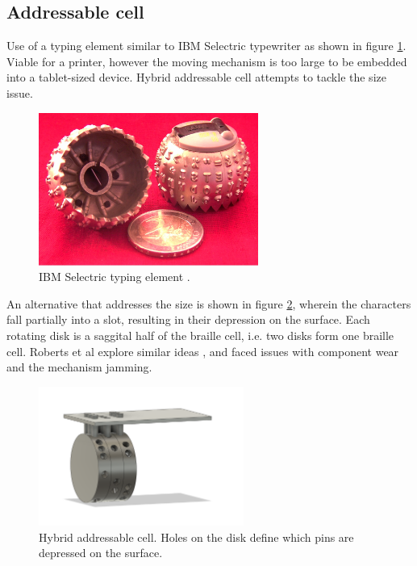     \subsection{Addressable cell}
    Use of a typing element similar to IBM Selectric typewriter as shown in figure \ref{fig:IBM_Selectric_Globe_Wiki.jpg}. Viable for a printer, however the moving mechanism is too large to be embedded into a tablet-sized device. Hybrid addressable cell attempts to tackle the size issue.
    \begin{figure}[h]
    \centering
        \includegraphics[height=5cm]{figures/IBM_Selectric_Globe_Wiki.jpg}
    \caption[IBM Selectric typing element]{IBM Selectric typing element \cite{wiki:IBMSelectric}.}
    \label{fig:IBM_Selectric_Globe_Wiki.jpg}
    \end{figure}

    An alternative that addresses the size is shown in figure \ref{fig:rotation.png}, wherein the characters fall partially into a slot, resulting in their depression on the surface. Each rotating disk is a saggital half of the braille cell, i.e. two disks form one braille cell. Roberts et al explore similar ideas \cite{roberts_492_2000}, and faced issues with component wear and the mechanism jamming.

    \begin{figure}[h]
    \centering
        \includegraphics[width=0.6\textwidth]{figures/rotation.png}
    \caption{Hybrid addressable cell. Holes on the disk define which pins are depressed on the surface.}
    \label{fig:rotation.png}
    \end{figure}

